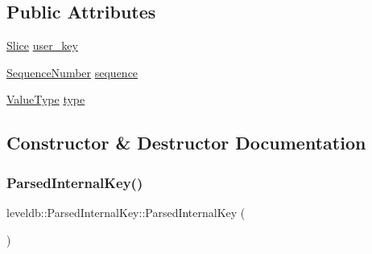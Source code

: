 \subsection*{Public Attributes}
\begin{DoxyCompactItemize}
\item 
\mbox{\hyperlink{classleveldb_1_1_slice}{Slice}} \mbox{\hyperlink{structleveldb_1_1_parsed_internal_key_aa6e30fcf3c95fc1485d60fa08efe2b9d}{user\+\_\+key}}
\item 
\mbox{\hyperlink{namespaceleveldb_a5481ededd221c36d652c371249f869fa}{Sequence\+Number}} \mbox{\hyperlink{structleveldb_1_1_parsed_internal_key_a3ab7f4382bc026081875fde4dea95e61}{sequence}}
\item 
\mbox{\hyperlink{namespaceleveldb_acc038cb0d608414730cafa459a4ba866}{Value\+Type}} \mbox{\hyperlink{structleveldb_1_1_parsed_internal_key_ac7c10a6f60f93982b886ad1fbbafd6c2}{type}}
\end{DoxyCompactItemize}


\subsection{Constructor \& Destructor Documentation}
\mbox{\label{structleveldb_1_1_parsed_internal_key_a23885ae8c8ccb36e01cdb3469ea21d67}} 
\subsubsection{\texorpdfstring{ParsedInternalKey()}{ParsedInternalKey()}\hspace{0.1cm}{\footnotesize\ttfamily [1/2]}}
{\footnotesize\ttfamily leveldb\+::\+Parsed\+Internal\+Key\+::\+Parsed\+Internal\+Key (\begin{DoxyParamCaption}{ }\end{DoxyParamCaption})\hspace{0.3cm}{\ttfamily [inline]}}

\mbox{\label{structleveldb_1_1_parsed_internal_key_acc24f6ddeb4223d0484613076a48a9a1}} 
